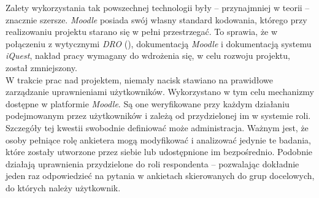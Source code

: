 Zalety wykorzystania tak powszechnej technologii były -- przynajmniej w teorii -- znacznie szersze. \textit{Moodle} posiada swój własny standard kodowania, którego przy realizowaniu projektu starano się w pełni przestrzegać. To sprawia, że w połączeniu z wytycznymi \textit{DRO} (), dokumentacją \textit{Moodle} i dokumentacją systemu \textit{iQuest}, nakład pracy wymagany do wdrożenia się, w celu rozwoju projektu, został zmniejszony. \\

W trakcie prac nad projektem, niemały nacisk stawiano na prawidłowe zarządzanie uprawnieniami użytkowników. Wykorzystano w tym celu mechanizmy dostępne w platformie \textit{Moodle}. Są one weryfikowane przy każdym działaniu podejmowanym przez użytkowników i zależą od przydzielonej im w systemie roli. Szczegóły tej kwestii swobodnie definiować może administracja. Ważnym jest, że osoby pełniące rolę ankietera mogą modyfikować i analizować jedynie te badania, które zostały utworzone przez siebie lub udostępnione im bezpośrednio. Podobnie działają uprawnienia przydzielone do roli respondenta -- pozwalając dokładnie jeden raz odpowiedzieć na pytania w ankietach skierowanych do grup docelowych, do których należy użytkownik.